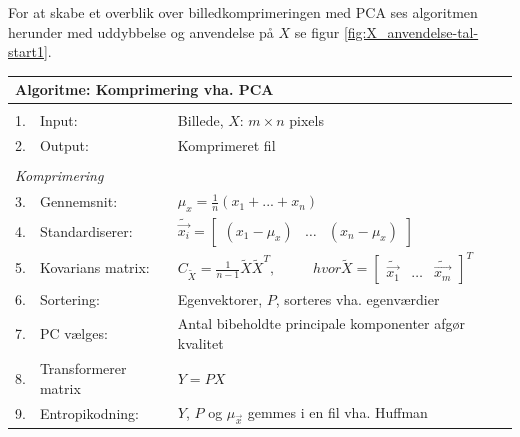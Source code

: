 For at skabe et overblik over billedkomprimeringen med PCA ses algoritmen herunder med uddybbelse og anvendelse på $X$ se figur \ref{fig:X_anvendelse-tal-start1}.

\begin{table}[!h]
\centering
\begin{tabular}{lll}
\hline
\multicolumn{3}{l}{\textbf{Algoritme: Komprimering vha. PCA}}\\                                                             \hline
\\
\multicolumn{1}{|l}{1.}        & Input:                     & Billede, $X$: $m \times n$ pixels                                   \\
\multicolumn{1}{|l}{2.}        & Output:                    & Komprimeret fil                                           \\
                               &                            &                                                                   \\
\multicolumn{2}{|l}{\textit{Komprimering}}                 &                                                                   \\
\multicolumn{1}{|l}{3.}        & Gennemsnit:                  & $\mu_{x} = \frac{1}{n}(x_1+ ... + x_n)$           \\
\multicolumn{1}{|l}{4.}        & Standardiserer:			 & 
$\tilde{\vec{x_i}} = \begin{bmatrix} (x_1 - \mu_{x}) & \hdots & (x_n - \mu_{x}) \end{bmatrix}$          \\
\multicolumn{1}{|l}{5.}        & Kovarians matrix:              & 
$C_{\tilde{X}}=\frac{1}{n-1} \tilde{X}\tilde{X}^T , \phantom{mmm} hvor \tilde{X}= \begin{bmatrix} \tilde{\vec{x_1}} &		\hdots & \tilde{\vec{x_m}}  \end{bmatrix}^T$           \\
\multicolumn{1}{|l}{6.}        & Sortering:              & Egenvektorer, $P$, sorteres vha. egenværdier \\
\multicolumn{1}{|l}{7.}        & PC vælges:    			& 
Antal bibeholdte principale komponenter afgør kvalitet  \\
\multicolumn{1}{|l}{8.}        & Transformerer matrix          & 
$Y = PX$            \\
\multicolumn{1}{|l}{9.}        & Entropikodning:        & $Y$, $P$ og $\mu_{\vec{x}}$ gemmes i en fil vha. Huffman     \\
\end{tabular}
\label{tb:Algoritme-Komprimering-PCA}
\end{table}


